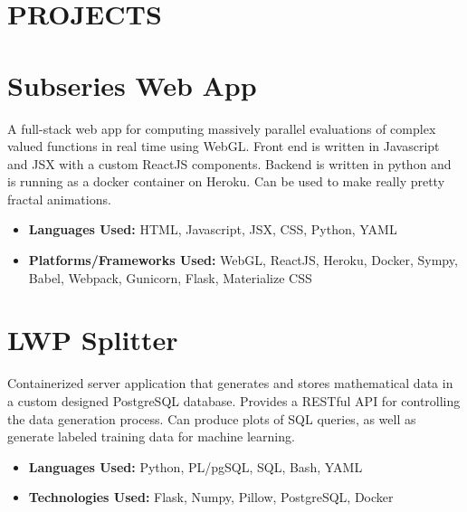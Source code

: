 \documentclass[margin]{../res}
\begin{document}
  

\address{Email: raphaelreyna@protonmail.com \\
  Phone: (626) 384-1342 \\
  Site: www.raphaelreyna.works}
                           
                        
\begin{resume} 
\section{PROJECTS}
  
\normalsize{\section{Subseries Web App}}
A full-stack web app for computing massively parallel evaluations of complex
valued functions in real time using WebGL.
Front end is written in Javascript and JSX with a custom ReactJS components.
Backend is written in python and is running as a docker container on Heroku.
Can be used to make really pretty fractal animations.
\begin{multicols}{2}
\begin{itemize}
\item {\bf Languages Used: }\newline HTML, Javascript, JSX, CSS, Python, YAML
  \columnbreak
\item {\bf Platforms/Frameworks Used: }\newline WebGL, ReactJS, Heroku,
  Docker, Sympy, Babel, Webpack, Gunicorn, Flask, Materialize CSS
\end{itemize}
\end{multicols}

\normalsize{\section{LWP Splitter}}
Containerized server application that generates and stores mathematical data in
a custom designed PostgreSQL database.
Provides a RESTful API for controlling the data generation process.
Can produce plots of SQL queries, as well as generate labeled training data for machine learning.
\begin{multicols}{2}
\begin{itemize}
\item {\bf Languages Used: }\newline
  Python, PL/pgSQL, SQL, Bash, YAML
  \columnbreak
\item {\bf Technologies Used: } \newline
  Flask, Numpy, Pillow, PostgreSQL, Docker
\end{itemize}
\end{multicols}


\end{resume}
\end{document}
